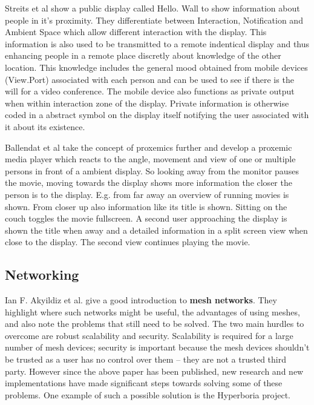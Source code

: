 Streits et al \cite{streitz_ambient_2003} show a public display called Hello.
Wall to show information about people in it’s proximity.
They differentiate between Interaction, Notification and Ambient Space which allow different interaction with the display.
This information is also used to be transmitted to a remote indentical display and thus enhancing people in a remote place discretly about knowledge of the other location.
This knowledge includes the general mood obtained from mobile devices (View.Port) associated with each person and can be used to see if there is the will for a video conference.
The mobile device also functions as private output when within interaction zone of the display.
Private information is otherwise coded in a abstract symbol on the display itself notifying the user associated with it about its existence.


Ballendat et al \cite{ballendat_proxemic_2010} take the concept of proxemics further and develop a proxemic media player which reacts to the angle, movement and view of one or multiple persons in front of a ambient display.
So looking away from the monitor pauses the movie, moving towards the display shows more information the closer the person is to the display. E.g. from far away an overview of running movies is shown.
From closer up also information like its title is shown.
Sitting on the couch toggles the movie fullscreen.
A second user approaching the display is shown the title when away and a detailed information in a split screen view when close to the display.
The second view continues playing the movie.



\subsection{Networking}

Ian F. Akyildiz et al. \cite{akyildiz2005survey} give a good introduction to \textbf{mesh networks}.
They highlight where such networks might be useful, the advantages of using meshes, and also note the problems that still need to be solved.
The two main hurdles to overcome are robust scalability and security.
Scalability is required for a large number of mesh devices; security is important because the mesh devices shouldn't be trusted as a user has no control over them – they are not a trusted third party.
However since the above paper has been published, new research and new implementations have made significant steps towards solving some of these problems.
One example of such a possible solution is the Hyperboria \cite{hyperboria} project.

